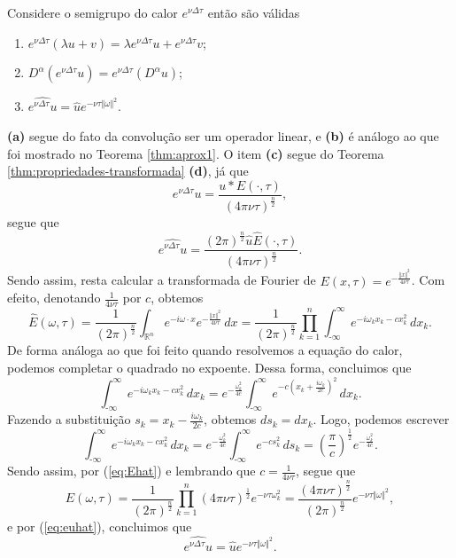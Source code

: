 \documentclass[a4paper, 11pt]{book}
\theoremstyle{definition}
\newcommand{\m}{\text{-}}
\newcommand{\bR}{\mathbb{R}}
\begin{document}
\begin{pbox} \label{thm:propriedades-semi-grupo-calor}
    Considere o semigrupo do calor $e^{\nu\Delta\tau}$ então são válidas
    \begin{enumerate}[leftmargin=*, label=\textbf{(\alph*)}]
        \item $e^{\nu\Delta\tau}(\lambda u + v) = \lambda e^{\nu\Delta\tau} u + e^{\nu\Delta\tau} v$;
        \item $D^\alpha (e^{\nu\Delta\tau} u) = e^{\nu\Delta\tau} (D^\alpha u)$;
        \item $\widehat{e^{\nu\Delta \tau} u} = \hat u e^{-\nu \tau \Vert \omega \Vert^2}$.
    \end{enumerate}
\end{pbox} 
\begin{prf}
    \textbf{(a)} segue do fato da convolução ser um operador linear,
    e
    \textbf{(b)} é análogo ao que foi mostrado no Teorema \ref{thm:aprox1}.
    O item \textbf{(c)} segue do Teorema \ref{thm:propriedades-transformada} \textbf{(d)}, já que
    \[
        e^{\nu \Delta \tau} u = \frac{u * E(\cdot,\tau)}{(4\pi \nu \tau)^{\frac{n}{2}}},
    \]
    segue que
    \begin{equation} \label{eq:euhat}
        \widehat{e^{\nu \Delta \tau} u} = \frac{(2\pi)^{\frac{n}{2}} \hat u \hat E(\cdot,\tau)}{(4\pi\nu\tau)^{\frac{n}{2}}}.
    \end{equation}
    Sendo assim, resta calcular a transformada de Fourier de $E(x,\tau) = e^{-\frac{\Vert x \Vert^2}{4\nu\tau}}$.
    Com efeito, denotando $\frac{1}{4\nu\tau}$ por $c$, obtemos
    \begin{equation} \label{eq:Ehat}
        \hat{E}(\omega,\tau) = \frac{1}{(2\pi)^{\frac{n}{2}}}\int_{\bR^n} e^{-i\omega\cdot x} e^{-\frac{\Vert x \Vert^2}{4\nu\tau}} \,dx = \frac{1}{(2\pi)^{\frac{n}{2}}} \prod_{k=1}^n \int_{\m\infty}^\infty e^{-i\omega_k x_k - cx_k^2} \,dx_k.
    \end{equation}
    De forma análoga ao que foi feito quando resolvemos a equação do calor, podemos completar o quadrado no expoente. Dessa forma, concluimos que
    \[
        \int_{\m\infty}^\infty e^{-i\omega_k x_k - cx_k^2} \,dx_k = e^{-\frac{\omega_k^2}{4c}}\int_{\m\infty}^\infty e^{-c\left( x_k + \frac{i\omega_k}{2c} \right)^2} \,dx_k. 
    \]
    Fazendo a substituição $s_k = x_k - \frac{i\omega_k}{2c}$, obtemos $ds_k = dx_k$. Logo, podemos escrever
    \[
        \int_{\m\infty}^\infty e^{-i\omega_k x_k - cx_k^2} \,dx_k = e^{-\frac{\omega_k^2}{4c}}\int_{\m\infty}^\infty e^{-cs_k^2} \,ds_k = \left( \frac{\pi}{c} \right)^{\frac{1}{2}} e^{-\frac{\omega_k^2}{4c}}. 
    \]
    Sendo assim, por (\ref{eq:Ehat}) e lembrando que $c = \frac{1}{4\nu\tau}$, segue que
    \[
        \hat E(\omega,\tau) = \frac{1}{(2\pi)^{\frac{n}{2}}} \prod_{k=1}^n (4\pi \nu \tau)^{\frac{1}{2}} e^{-\nu \tau \omega_k^2} = \frac{(4\pi\nu\tau)^{\frac{n}{2}}}{(2\pi)^{\frac{n}{2}}} e^{-\nu\tau \Vert \omega \Vert^2},
    \]
    e por (\ref{eq:euhat}), concluimos que
    \[
        \widehat{e^{\nu\Delta \tau} u} = \hat u e^{-\nu\tau \Vert \omega \Vert^2}.
    \]
\end{prf}
\end{document}
